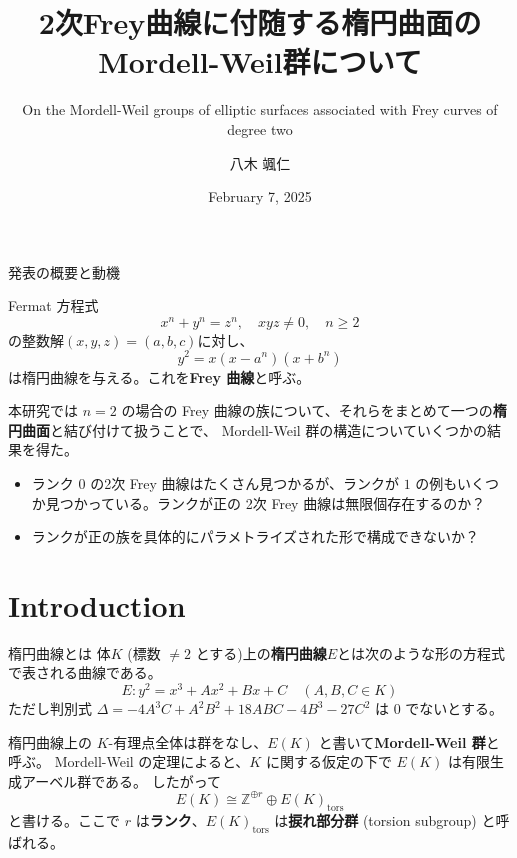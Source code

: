 \documentclass{classes/mybeamer}
\title{2次Frey曲線に付随する楕円曲面のMordell-Weil群について}
\subtitle{On the Mordell-Weil groups of elliptic surfaces associated with Frey curves of degree two}
\author{八木 颯仁}
\institute{慶應義塾大学 栗原研究室 修士2年}
\date{February 7, 2025}
\begin{document}
\begin{frame}
    \titlepage
\end{frame}

\begin{frame}{発表の概要と動機}
    \begin{dfn*}
        Fermat 方程式
        \begin{equation*}
            x^n + y^n = z^n, \quad xyz \neq 0, \quad n \geq 2
        \end{equation*}
        の整数解$(x, y, z)=(a,b,c)$に対し、
        \begin{equation*}
            y^2 = x (x-a^n) (x+b^n)
        \end{equation*}
        は楕円曲線を与える。これを\color{blue}\textbf{Frey 曲線}\color{black}と呼ぶ。
    \end{dfn*}
    本研究では $n=2$ の場合の Frey 曲線の族について、それらをまとめて一つの\textbf{楕円曲面}と結び付けて扱うことで、 Mordell-Weil 群の構造についていくつかの結果を得た。
    \begin{itemize}
        \item ランク $0$ の2次 Frey 曲線はたくさん見つかるが、ランクが $1$ の例もいくつか見つかっている。ランクが正の 2次 Frey 曲線は無限個存在するのか？
        \item ランクが正の族を具体的にパラメトライズされた形で構成できないか？
    \end{itemize}
    \vspace{1em}
    \tableofcontents
\end{frame}

\section{Introduction}
\begin{frame}{楕円曲線とは}
    体$K$ (標数 $\neq2$ とする)上の\color{blue}\textbf{楕円曲線}\color{black}$E$とは次のような形の方程式で表される曲線である。
    \begin{equation*}
        E: y^{2} = x^{3} + Ax^2 + Bx + C \quad (A,B,C \in K)
    \end{equation*}
    ただし判別式 $\Delta = -4A^3C + A^2B^2 + 18ABC - 4B^3 - 27C^2$ は $0$ でないとする。

    \vspace{1cm}

    楕円曲線上の $K$-有理点全体は群をなし、$E(K)$ と書いて\color{blue}\textbf{Mordell-Weil 群}\color{black}と呼ぶ。
    Mordell-Weil の定理によると、$K$ に関する仮定の下で $E(K)$ は有限生成アーベル群である。
    したがって
    \begin{equation*}
        E(K) \cong \mathbb{Z}^{\oplus r} \oplus E(K)_{\mathrm{tors}}
    \end{equation*}
    と書ける。ここで $r$ は\color{blue}\textbf{ランク}\color{black}、$E(K)_{\mathrm{tors}}$ は\color{blue}\textbf{捩れ部分群}\color{black} (torsion subgroup) と呼ばれる。
\end{frame}
\end{document}
